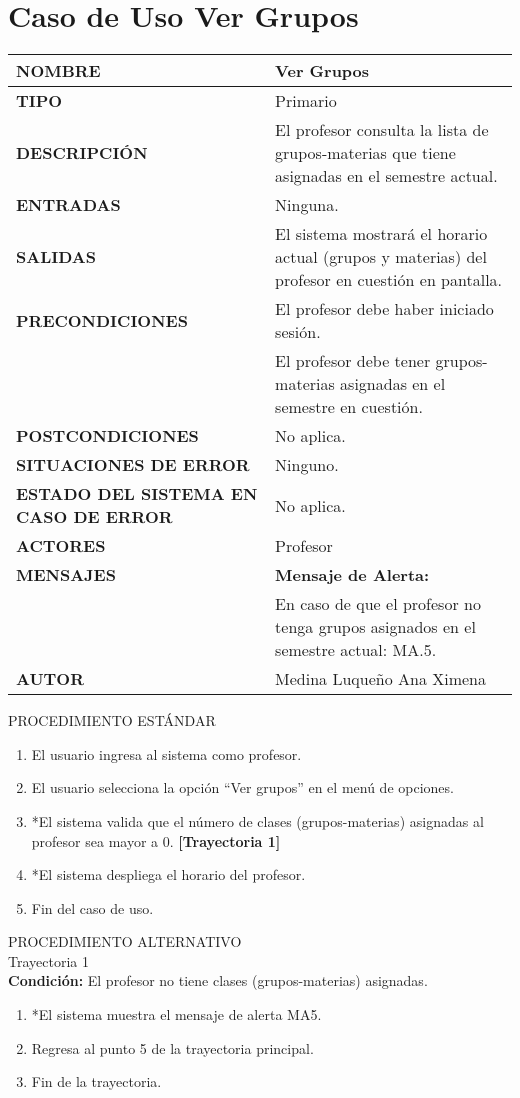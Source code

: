 \newpage
\section{Caso de Uso Ver Grupos}
\begin{longtable}{ | p{6cm} | p{10cm} |}
\hline
\textbf{NOMBRE} & Ver Grupos\\
\hline
\textbf{TIPO} & Primario\\
\hline
\textbf{DESCRIPCIÓN} & El profesor consulta la lista de grupos-materias que tiene asignadas en el semestre actual.\\
\hline
\textbf{ENTRADAS} & Ninguna.\\
\hline
\textbf{SALIDAS} & El sistema mostrará el horario actual (grupos y materias) del profesor en cuestión en pantalla.\\
\hline
\textbf{PRECONDICIONES} & El profesor debe haber iniciado sesión.
                        \\ & El profesor debe tener grupos-materias asignadas en el semestre en cuestión.\\
\hline
\textbf{POSTCONDICIONES} & No aplica.\\
\hline
\textbf{SITUACIONES DE ERROR} & Ninguno.\\
\hline
\textbf{ESTADO DEL SISTEMA EN CASO DE ERROR} & No aplica.\\
\hline
\textbf{ACTORES} & Profesor\\
\hline
\textbf{MENSAJES} & \textbf{Mensaje de Alerta:} \\ & En caso de que el profesor no tenga grupos asignados en el semestre actual: MA.5.\\
\hline
\textbf{AUTOR} & Medina Luqueño Ana Ximena\\
\hline
\end{longtable}
\vspace*{1cm}
\noindent
\Large{PROCEDIMIENTO ESTÁNDAR}
\large{}
\begin{enumerate}
    \item	El usuario ingresa al sistema como profesor.
    \item	El usuario selecciona la opción “Ver grupos” en el menú de opciones.
    \item	*El sistema valida que el número de clases (grupos-materias) asignadas al profesor sea mayor a 0. \textbf{[Trayectoria 1]}
    \item	*El sistema despliega el horario del profesor.
    \item	Fin del caso de uso.
\end{enumerate}
\vspace*{1cm}
\Large{PROCEDIMIENTO ALTERNATIVO}\\
\large{Trayectoria 1}\\
\textbf{Condición:} El profesor no tiene clases (grupos-materias) asignadas.
\begin{enumerate}
    \item *El sistema muestra el mensaje de alerta MA5.
    \item Regresa al punto 5 de la trayectoria principal.
    \item Fin de la trayectoria.
\end{enumerate}
